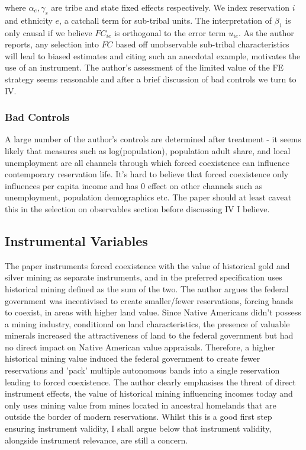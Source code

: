 \documentclass[12pt]{article}
\begin{document}
where $\alpha_e, \gamma_s$ are tribe and state fixed effects respectively. We index reservation $i$ and ethnicity $e$, a catchall term for sub-tribal units.
 The interpretation of $\beta_1$ is only causal if we believe $FC_{ie}$ is orthogonal to the error term $u_{ie}$. As the author reports, any selection into 
 $FC$ based off unobservable sub-tribal characteristics will lead to biased estimates and citing such an anecdotal example, motivates the use of an instrument. The author's 
 assessment of the limited value of the FE strategy seems reasonable and after a brief discussion of bad controls we turn to IV.

\subsubsection*{Bad Controls}

A large number of the author's controls are determined after treatment - it seems likely that measures such as log(population), population adult share, and local unemployment are all channels through which forced coexistence can influence contemporary reservation life. It's hard to believe that forced coexistence only influences 
per capita income and has 0 effect on other channels such as unemployment, population demographics etc. The paper should at least caveat this in the selection on observables section 
before discussing IV I believe.

\subsection{Instrumental Variables}
The paper instruments forced coexistence with the value of historical gold and silver mining as separate instruments, and in the preferred specification uses historical mining defined 
as the sum of the two. The author argues the federal government was incentivised to create smaller/fewer reservations, forcing bands to coexist, in areas with higher land value. Since Native 
Americans didn't possess a mining industry, conditional on land characteristics, the presence of valuable minerals increased the attractiveness of land to the federal government but had no
direct impact on Native American value appraisals. Therefore, a higher historical mining value induced the federal government to create fewer reservations and 'pack' multiple autonomous bands
into a single reservation leading to forced coexistence. The author clearly emphasises the threat of direct instrument effects, the value of historical mining  influencing incomes today
and only uses mining value from mines located in ancestral homelands that are outside the border of modern reservations. Whilst this is a good first step ensuring instrument validity, I shall argue 
below that instrument validity, alongside instrument relevance, are still a concern.
\end{document}
